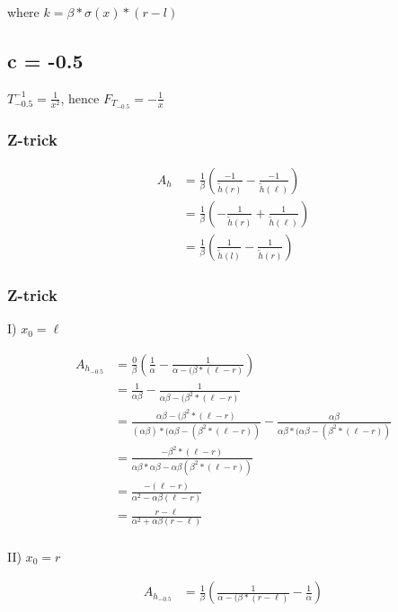 where $k = \beta * \sigma(x) * (r - l)$

\subsection{c = -0.5}

$T_{-0.5}^{-1} = \frac{1}{x^2}$, hence $F_{T_{-0.5}} = - \frac{1}{x}$


\subsubsection{Z-trick}


\begin{align*}
A_h &= \frac{1}{\beta} \left(\frac{-1}{\tilde{h}(r)} - \frac{-1}{\tilde{h}(\ell)} \right) \\
& = \frac{1}{\beta} \left(- \frac{1}{\tilde{h}(r)} + \frac{1}{\tilde{h}(\ell)} \right) \\
& = \frac{1}{\beta} \left(\frac{1}{\tilde{h}(l)} - \frac{1}{\tilde{h}(r)} \right)
\end{align*}

\subsubsection{Z-trick}

I) $x_0 = \ell$

\begin{align*}
	A_{h_{-0.5}} & = \frac{0}{\beta} \left(\frac{1}{\alpha} - \frac{1}{\alpha - (\beta * (\ell - r)} \right) \\
	& = \frac{1}{\alpha \beta} - \frac{1}{\alpha \beta - (\beta^2 * (\ell - r)} \\
	& = \frac{\alpha \beta - (\beta^2 * (\ell - r)}{(\alpha \beta) * (\alpha \beta - (\beta^2 * (\ell - r))} - \frac{\alpha \beta}{\alpha \beta * ( \alpha \beta - (\beta^2 * (\ell - r))} \\
	& = \frac{-\beta^2 * (\ell - r)}{\alpha \beta * \alpha \beta - \alpha \beta (\beta^2 * (\ell - r))}\\
	& = \frac{-(\ell - r)}{\alpha^2 - \alpha \beta (\ell - r)}\\
	& = \frac{r - \ell}{\alpha^2 + \alpha \beta (r - \ell)}\\
\end{align*}

II) $x_0 = r$

\begin{align*}
A_{h_{-0.5}} & = \frac{1}{\beta} \left(\frac{1}{\alpha - (\beta * (r - \ell)} - \frac{1}{\alpha} \right) \\
\end{align*}

